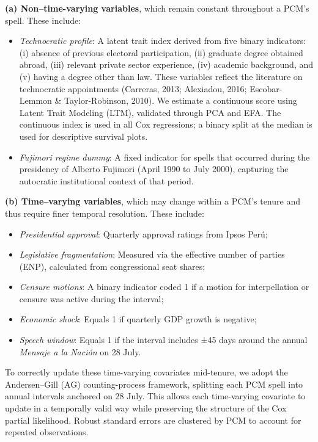 \documentclass[a4paper, 12pt]{article}
\begin{document}
\textbf{(a) Non–time-varying variables}, which remain constant throughout a PCM’s spell. These include:

\begin{itemize}
    \item \textit{Technocratic profile}: A latent trait index derived from five binary indicators: (i) absence of previous electoral participation, (ii) graduate degree obtained abroad, (iii) relevant private sector experience, (iv) academic background, and (v) having a degree other than law. These variables reflect the literature on technocratic appointments (Carreras, 2013; Alexiadou, 2016; Escobar-Lemmon \& Taylor-Robinson, 2010). We estimate a continuous score using Latent Trait Modeling (LTM), validated through PCA and EFA. The continuous index is used in all Cox regressions; a binary split at the median is used for descriptive survival plots.
    
    \item \textit{Fujimori regime dummy}: A fixed indicator for spells that occurred during the presidency of Alberto Fujimori (April 1990 to July 2000), capturing the autocratic institutional context of that period.
\end{itemize}

\textbf{(b) Time–varying variables}, which may change within a PCM’s tenure and thus require finer temporal resolution. These include:

\begin{itemize}
    \item \textit{Presidential approval}: Quarterly approval ratings from Ipsos Perú;
    \item \textit{Legislative fragmentation}: Measured via the effective number of parties (ENP), calculated from congressional seat shares;
    \item \textit{Censure motions}: A binary indicator coded 1 if a motion for interpellation or censure was active during the interval;
    \item \textit{Economic shock}: Equals 1 if quarterly GDP growth is negative;
    \item \textit{Speech window}: Equals 1 if the interval includes ±45 days around the annual \textit{Mensaje a la Nación} on 28 July.
\end{itemize}

To correctly update these time-varying covariates mid-tenure, we adopt the Andersen–Gill (AG) counting-process framework, splitting each PCM spell into annual intervals anchored on 28 July. This allows each time-varying covariate to update in a temporally valid way while preserving the structure of the Cox partial likelihood. Robust standard errors are clustered by PCM to account for repeated observations.
\end{document}
